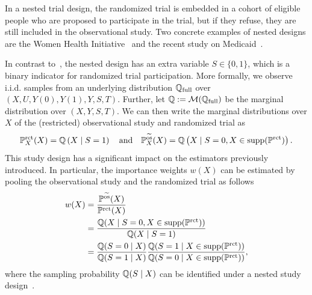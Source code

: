  In a nested trial design, the randomized trial is embedded in a cohort of eligible people who are proposed to participate in the trial, but if they refuse, they are still included in the observational study. 
Two concrete examples of nested designs are the Women Health Initiative~\citep{anderson2003implementation} and the recent study on Medicaid~\citep{degtiar2021conditional}.


In contrast to~, the nested design has an extra variable $S \in \{0,1\}$, which is a binary indicator for randomized trial participation.
 More formally, we observe i.i.d. samples from an underlying distribution $\mathbb{Q}_{\operatorname{full}}$ over $\left(X, U, Y(0), Y(1),Y, S, T\right)$. Further, let $\mathbb{Q} := \mathcal{M}(\mathbb{Q}_{\operatorname{full}})$ be the marginal distribution  over $(X,Y,S,T)$. We can then  write the marginal distributions over $X$ of the  (restricted) observational study and randomized trial  as 
$$
\mathbb{P}^{\operatorname{rct}}_X(X) =  \mathbb{Q}\left(X \mid S=1 \right) \quad \mathrm{and}  \quad 
\mathbb{P}^{\widetilde{\mathrm{os}}}_X(X) = \mathbb{Q}\left(X \mid S=0, X \in {\operatorname{supp}}(\mathbb{P}^{\operatorname{rct}}) \right).$$
This study design has a significant impact on the estimators previously introduced. In particular, the importance weights $w(X)$ can be estimated by pooling the observational study and the randomized trial as follows %
\begin{align*}
	w(X) &= \frac{\mathbb{P}^{\widetilde{\mathrm{os}}}(X)}{\mathbb{P}^{\operatorname{rct}}(X)} \\&= \frac{\mathbb{Q}(X\mid S=0, X\in {\operatorname{supp}}(\mathbb{P}^{\operatorname{rct}}))}{\mathbb{Q}(X \mid S=1)}\\
	&= \frac{\mathbb{Q}(S=0\mid X) }{\mathbb{Q}(S=1\mid X)} \frac{\mathbb{Q}(S=1 \mid X \in {\operatorname{supp}}(\mathbb{P}^{\operatorname{rct}}))}{\mathbb{Q}(S=0 \mid X \in {\operatorname{supp}}(\mathbb{P}^{\operatorname{rct}}))},
\end{align*}
where the sampling probability $\mathbb{Q}(S\mid X)$ can be identified under a nested study design~\citep{dahabreh2021study}.


